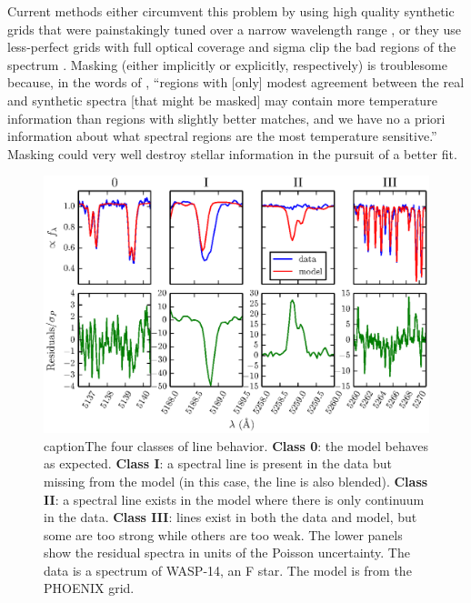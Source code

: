 \documentclass[preprint]{aastex} %
\begin{document}
Current methods either circumvent this problem by using high quality synthetic grids that were painstakingly tuned over a narrow wavelength range \citep[$\lesssim 500$ \AA]{blj+12,sb13}, or they use less-perfect grids with full optical coverage and sigma clip the bad regions of the spectrum \citep{kpb+09,mga13}. Masking (either implicitly or explicitly, respectively) is troublesome because, in the words of \citet{mga13}, ``regions with [only] modest agreement between the real and synthetic spectra [that might be masked] may contain more temperature information than regions with slightly better matches, and we have no a priori information about what spectral regions are the most temperature sensitive.'' Masking could very well destroy stellar information in the pursuit of a better fit. 

\begin{figure}[!htb]
\begin{center}
\includegraphics{lineclasses}
caption{The four classes of line behavior. \textbf{Class 0}: the model behaves as expected. \textbf{Class I}: a spectral line is present in the data but missing from the model (in this case, the line is also blended). \textbf{Class II}: a spectral line exists in the model where there is only continuum in the data. \textbf{Class III}: lines exist in both the data and model, but some are too strong while others are too weak. The lower panels show the residual spectra in units of the Poisson uncertainty. The data is a spectrum of WASP-14, an F star. The model is from the PHOENIX grid\citep{hwd+13}.}
\label{fig:lineclasses}
\end{center}
\end{figure}
\end{document}
